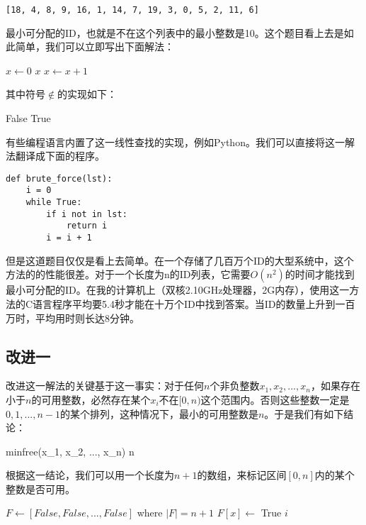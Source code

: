 \documentclass{article}
\begin{document}
\begin{verbatim}
[18, 4, 8, 9, 16, 1, 14, 7, 19, 3, 0, 5, 2, 11, 6]
\end{verbatim}

最小可分配的ID，也就是不在这个列表中的最小整数是10。这个题目看上去是如此简单，我们可以立即写出下面解法：

\begin{algorithmic}[1]
  \State $x \gets 0$
  \Loop
      \State \Return $x$
    \Else
      \State $x \gets x + 1$
    \EndIf
  \EndLoop
\EndFunction
\end{algorithmic}

其中符号$\notin$的实现如下：

\begin{algorithmic}[1]
      \State \Return False
    \EndIf
  \EndFor
  \State \Return True
\EndFunction
\end{algorithmic}

有些编程语言内置了这一线性查找的实现，例如Python。我们可以直接将这一解法翻译成下面的程序。

\lstset{language=Python}
\begin{lstlisting}
def brute_force(lst):
    i = 0
    while True:
        if i not in lst:
            return i
        i = i + 1
\end{lstlisting}

但是这道题目仅仅是看上去简单。在一个存储了几百万个ID的大型系统中，这个方法的的性能很差。对于一个长度为n的ID列表，它需要$O(n^2)$的时间才能找到最小可分配的ID。在我的计算机上（双核2.10GHz处理器，2G内存），使用这一方法的C语言程序平均要5.4秒才能在十万个ID中找到答案。当ID的数量上升到一百万时，平均用时则长达8分钟。

\subsection{改进一}
改进这一解法的关键基于这一事实：对于任何$n$个非负整数$x_1, x_2, ..., x_n$，如果存在小于$n$的可用整数，必然存在某个$x_i$不在$[0, n)$这个范围内。否则这些整数一定是$0, 1, ..., n-1$的某个排列，这种情况下，最小的可用整数是$n$。于是我们有如下结论：

\be
minfree(x_1, x_2, ..., x_n) \leq n
\label{eq:min-free}
\ee

根据这一结论，我们可以用一个长度为$n+1$的数组，来标记区间$[0, n]$内的某个整数是否可用。

\begin{algorithmic}[1]
  \State $F \gets [False, False, ..., False]$ where $|F| = n+1$
      \State $F[x] \gets$ True
    \EndIf
  \EndFor
      \State \Return $i$
    \EndIf
  \EndFor
\EndFunction
\end{algorithmic}
\end{document}
